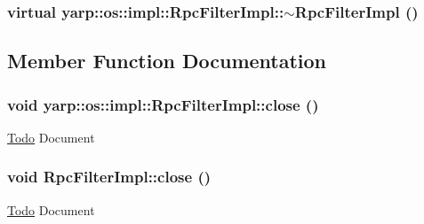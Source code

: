 \hypertarget{classyarp_1_1os_1_1impl_1_1_rpc_filter_impl_a2d71b3e5d746ff637419ee48fa8f2d3e}{
\subsubsection[{$\sim$RpcFilterImpl}]{\setlength{\rightskip}{0pt plus 5cm}virtual yarp::os::impl::RpcFilterImpl::$\sim$RpcFilterImpl ()}}
\label{classyarp_1_1os_1_1impl_1_1_rpc_filter_impl_a2d71b3e5d746ff637419ee48fa8f2d3e}


\subsection{Member Function Documentation}
\hypertarget{classyarp_1_1os_1_1impl_1_1_rpc_filter_impl_af8bff36f13d6f2a7460e5e4fd894cd9e}{
\subsubsection[{close}]{\setlength{\rightskip}{0pt plus 5cm}void yarp::os::impl::RpcFilterImpl::close ()}}
\label{classyarp_1_1os_1_1impl_1_1_rpc_filter_impl_af8bff36f13d6f2a7460e5e4fd894cd9e}
\begin{Desc}
\item[\hyperlink{todo__todo000013}{Todo}]Document \end{Desc}
\hypertarget{classyarp_1_1os_1_1impl_1_1_rpc_filter_impl_a6617044e3948a5fa890a68a918d93c72}{
\subsubsection[{close}]{\setlength{\rightskip}{0pt plus 5cm}void RpcFilterImpl::close ()}}
\label{classyarp_1_1os_1_1impl_1_1_rpc_filter_impl_a6617044e3948a5fa890a68a918d93c72}
\begin{Desc}
\item[\hyperlink{todo__todo000003}{Todo}]Document \end{Desc}
